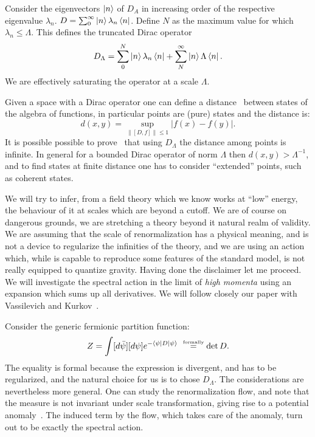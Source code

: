 \documentclass[12pt,a4paper]{article}
\newcommand{\be}{\begin{equation}}
\newcommand{\ee}{\end{equation}}
\newcommand{\formula}[1]{\be #1 \ee}
\newcommand{\formu}[1]{$  #1$}
\begin{document}
Consider the eigenvectors $\ket{n}$ of \formu{D_A} in increasing order of the respective eigenvalue \formu{\lambda_n}. \formu{D=\sum_0^\infty\ket n \lambda_n \bra n}. Define \formu N as the maximum value for which \formu{\lambda_n\leq\Lambda}.  This defines the truncated Dirac operator 
\be
D_\Lambda=\sum_0^N\ket n \lambda_n \bra n+\sum_N^\infty\ket n \Lambda \bra n. 
\ee
We are effectively saturating the operator at a scale \formu{\Lambda}.

Given a space with a Dirac operator one can define a distance~\cite{Connesbook} between states of the algebra of functions, in particular points are (pure) states and the distance is:
\be d(x,y)=\sup_{\|[D,f]\|\leq1}\left| f(x)-f(y)\right|.\ee
It is possible possible to prove~\cite{DAndrea:2013rix}
 that using \formu{D_\Lambda}   the distance among points is infinite. In general for a bounded Dirac operator of norm \formu{\Lambda} then \formu{d(x,y)>\Lambda^{-1}}, and to find states at finite distance one has to consider ``extended'' points, such as coherent states.



We will try to infer, from a field theory which we know works at ``low'' energy, the behaviour of it at scales which are beyond a cutoff. We are of course on dangerous grounds, we are stretching a theory beyond it natural realm of validity. We are assuming that the scale of renormalization has a physical meaning, and is not a device to regularize the infinities of the theory, and we are using an action which, while is capable to reproduce some features of the standard model, is not really equipped to quantize gravity.
Having done the disclaimer let me proceed. We will investigate the spectral action in the limit of \emph{high momenta} using an expansion which sums up all derivatives. We will follow closely our paper with Vassilevich and Kurkov~\cite{Kuliva}.

Consider the generic fermionic partition function:
\formula{Z = \int [d\bar\psi][d\psi]e^{-\langle \psi | D |\psi\rangle \ } \stackrel{\mbox{\tiny formally}}{=}  \det{ D} .} 
 The equality is formal because the expression is divergent, and has to be regularized, and the natural choice for us is to chose $D_\Lambda$. The considerations are nevertheless more general. One can study the renormalization flow, and note that the measure is not invariant under scale transformation, giving rise to a potential anomaly~\cite{Andrianov:2010nr, Andrianov:2011bc}.
The induced term by the flow, which takes care of the anomaly, turn out to be exactly the spectral action.
\end{document}
